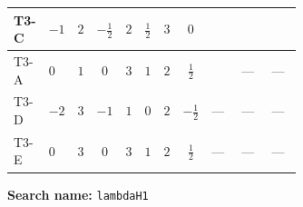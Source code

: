 \documentclass[8pt]{article}
\begin{document}
\begin{landscape}
\begin{longtable}{@{}llcccccc >{\raggedright\arraybackslash}p{0.21\linewidth} >{\raggedright\arraybackslash}p{0.21\linewidth} >{\raggedright\arraybackslash}p{0.21\linewidth}@{}}
\midrule
T3-C & $-1$ & $2$ & $-\frac{1}{2}$ & $2$ & $\frac{1}{2}$ & $3$ & $0$ & \scriptsize\adjustbox{max width=\linewidth}{$\begin{gathered} {\lambda_{H1}} (6 \operatorname{Tr}\!\left({Y_d}\,\left({Y_d}\right)^{\dagger}\right)+2 \operatorname{Tr}\!\left({Y_e}\,\left({Y_e}\right)^{\dagger}\right)+6 \operatorname{Tr}\!\left({Y_u}\,\left({Y_u}\right)^{\dagger}\right))\end{gathered}$} & \scriptsize\adjustbox{max width=\linewidth}{$\begin{gathered} +24 {\lambda_{H^\dagger H^\dagger S_1^\dagger S_1^\dagger}} \left({\lambda_{H^\dagger H^\dagger S_1^\dagger S_1^\dagger}}\right)^{*}\end{gathered}$} & \scriptsize\adjustbox{max width=\linewidth}{$\begin{gathered} +3 {\lambda_{S_1 S_1^{\dagger 2}S_2^\dagger}} \left({\lambda_{H H^\dagger S_1^\dagger S_2^\dagger}^{\rm Cross}}\right)^{*}\end{gathered}$} \\
\midrule
T3-A & $0$ & $1$ & $0$ & $3$ & $1$ & $2$ & $\frac{1}{2}$ & \scriptsize\adjustbox{max width=\linewidth}{$\begin{gathered} {\lambda_{H1}} (6 \operatorname{Tr}\!\left({Y_d}\,\left({Y_d}\right)^{\dagger}\right)+2 \operatorname{Tr}\!\left({Y_e}\,\left({Y_e}\right)^{\dagger}\right)+6 \operatorname{Tr}\!\left({Y_u}\,\left({Y_u}\right)^{\dagger}\right))\end{gathered}$} & --- & --- \\
\midrule
T3-D & $-2$ & $3$ & $-1$ & $1$ & $0$ & $2$ & $-\frac{1}{2}$ & --- & --- & --- \\
\midrule
T3-E & $0$ & $3$ & $0$ & $3$ & $1$ & $2$ & $\frac{1}{2}$ & --- & --- & --- \\
\midrule
\bottomrule
\end{longtable}
\clearpage
\noindent\textbf{Search name: }\texttt{lambdaH1}\par\smallskip

\end{landscape}
\end{document}

